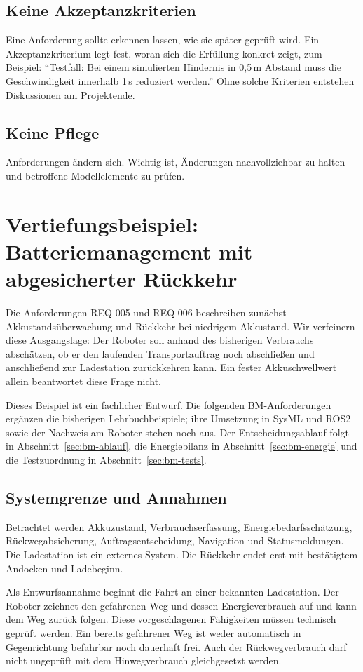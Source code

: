 \subsection{Keine Akzeptanzkriterien}
Eine Anforderung sollte erkennen lassen, wie sie später geprüft wird. Ein Akzeptanzkriterium legt fest, woran sich die Erfüllung konkret zeigt, zum Beispiel: \enquote{Testfall: Bei einem simulierten Hindernis in 0,5\,m Abstand muss die Geschwindigkeit innerhalb 1\,s reduziert werden.} Ohne solche Kriterien entstehen Diskussionen am Projektende.

\subsection{Keine Pflege}
Anforderungen ändern sich. Wichtig ist, Änderungen nachvollziehbar zu halten und betroffene Modellelemente zu prüfen.

\section{Vertiefungsbeispiel: Batteriemanagement mit abgesicherter Rückkehr}
\label{sec:bm-anforderungen}
Die Anforderungen REQ-005 und REQ-006 beschreiben zunächst Akkustandsüberwachung und Rückkehr bei niedrigem Akkustand. Wir verfeinern diese Ausgangslage: Der Roboter soll anhand des bisherigen Verbrauchs abschätzen, ob er den laufenden Transportauftrag noch abschließen und anschließend zur Ladestation zurückkehren kann. Ein fester Akkuschwellwert allein beantwortet diese Frage nicht.

Dieses Beispiel ist ein fachlicher Entwurf. Die folgenden BM-Anforderungen ergänzen die bisherigen Lehrbuchbeispiele; ihre Umsetzung in SysML und ROS2 sowie der Nachweis am Roboter stehen noch aus. Der Entscheidungsablauf folgt in Abschnitt~\ref{sec:bm-ablauf}, die Energiebilanz in Abschnitt~\ref{sec:bm-energie} und die Testzuordnung in Abschnitt~\ref{sec:bm-tests}.

\subsection{Systemgrenze und Annahmen}
Betrachtet werden Akkuzustand, Verbrauchserfassung, Energiebedarfsschätzung, Rückwegabsicherung, Auftragsentscheidung, Navigation und Statusmeldungen. Die Ladestation ist ein externes System. Die Rückkehr endet erst mit bestätigtem Andocken und Ladebeginn.

Als Entwurfsannahme beginnt die Fahrt an einer bekannten Ladestation. Der Roboter zeichnet den gefahrenen Weg und dessen Energieverbrauch auf und kann dem Weg zurück folgen. Diese vorgeschlagenen Fähigkeiten müssen technisch geprüft werden. Ein bereits gefahrener Weg ist weder automatisch in Gegenrichtung befahrbar noch dauerhaft frei. Auch der Rückwegverbrauch darf nicht ungeprüft mit dem Hinwegverbrauch gleichgesetzt werden.

